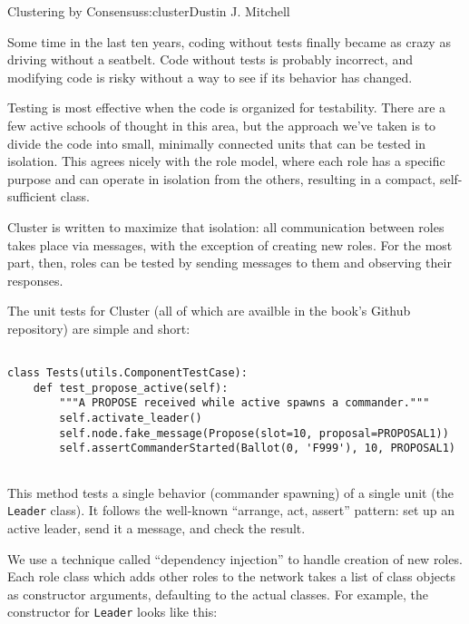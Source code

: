 \begin{aosachapter}{Clustering by Consensus}{s:cluster}{Dustin J. Mitchell}
\label{testing}

Some time in the last ten years, coding without tests finally became as
crazy as driving without a seatbelt. Code without tests is probably
incorrect, and modifying code is risky without a way to see if its
behavior has changed.

Testing is most effective when the code is organized for testability.
There are a few active schools of thought in this area, but the approach
we've taken is to divide the code into small, minimally connected units
that can be tested in isolation. This agrees nicely with the role model,
where each role has a specific purpose and can operate in isolation from
the others, resulting in a compact, self-sufficient class.

Cluster is written to maximize that isolation: all communication between
roles takes place via messages, with the exception of creating new
roles. For the most part, then, roles can be tested by sending messages
to them and observing their responses.

\label{unit-testing}

The unit tests for Cluster (all of which are availble in the book's
Github repository) are simple and short:

\begin{verbatim}

class Tests(utils.ComponentTestCase):
    def test_propose_active(self):
        """A PROPOSE received while active spawns a commander."""
        self.activate_leader()
        self.node.fake_message(Propose(slot=10, proposal=PROPOSAL1))
        self.assertCommanderStarted(Ballot(0, 'F999'), 10, PROPOSAL1)
    
\end{verbatim}

This method tests a single behavior (commander spawning) of a single
unit (the \texttt{Leader} class). It follows the well-known ``arrange,
act, assert'' pattern: set up an active leader, send it a message, and
check the result.

\label{dependency-injection}

We use a technique called ``dependency injection'' to handle creation of
new roles. Each role class which adds other roles to the network takes a
list of class objects as constructor arguments, defaulting to the actual
classes. For example, the constructor for \texttt{Leader} looks like
this:

\begin{verbatim}


\end{verbatim}
\end{aosachapter}
